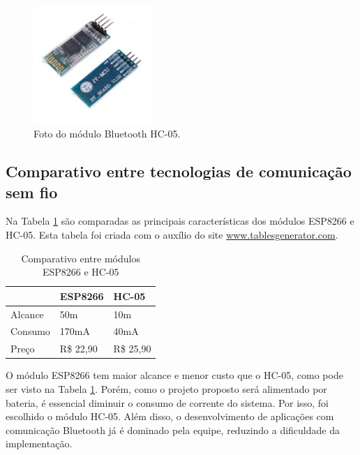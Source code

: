 \begin{figure}[!htb]
	\centering
	\includegraphics[width=0.4\textwidth]{./hc05.jpg} 
	\caption{Foto do módulo Bluetooth HC-05.}
	\label{fig:hc05}
\end{figure}

\subsection{Comparativo entre tecnologias de comunicação sem fio}
Na Tabela \ref{tab:semfio} são comparadas as principais características dos módulos ESP8266 e HC-05. Esta tabela foi criada com o auxílio do site \url{www.tablesgenerator.com}.

\begin{table}[!htb]
\centering
\begin{tabular}{l|l|l}
    ~       & ESP8266   & HC-05      \\
    \hline
    Alcance & 50m       & 10m        \\
    \hline
    Consumo & 170mA     & 40mA       \\
    \hline
    Preço   & R\$ 22,90 & R\$ 25,90  \\
    \hline
\end{tabular}
\caption{Comparativo entre módulos ESP8266 e HC-05}
\label{tab:semfio}
\end{table}

O módulo ESP8266 tem maior alcance e menor custo que o HC-05, como pode ser visto na Tabela \ref{tab:semfio}. Porém, como o projeto proposto será alimentado por bateria, é essencial diminuir o consumo de corrente do sistema. Por isso, foi escolhido o módulo HC-05. Além disso, o desenvolvimento de aplicações com comunicação Bluetooth já é dominado pela equipe, reduzindo a dificuldade da implementação.



